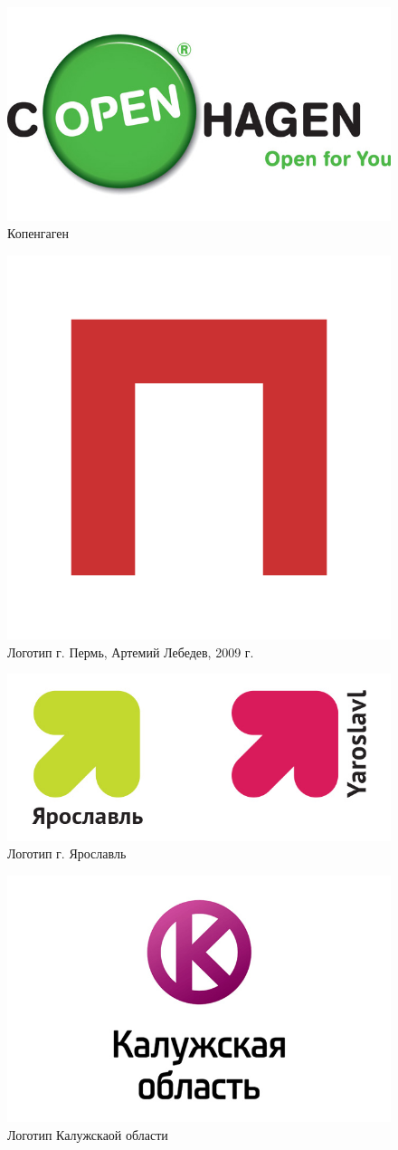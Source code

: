 \begin{figure}[ht]
  \centering
  \includegraphics[width=.5\linewidth]{images/supplement/territorial/copenhagen}
  \caption{Копенгаген}
  \label{fig:territorial:copenhagen}
\end{figure}

\begin{figure}[ht]
  \centering
  \includegraphics[width=.5\linewidth]{images/supplement/territorial/perm}
  \caption{Логотип г. Пермь, Артемий Лебедев, 2009 г.}
  \label{fig:territorial:perm}
\end{figure}

\begin{figure}[ht]
  \centering
  \includegraphics[width=.5\linewidth]{images/supplement/territorial/yaroslavl}
  \caption{Логотип г. Ярославль}
  \label{fig:territorial:yaroslavl}
\end{figure}

\begin{figure}[ht]
  \centering
  \includegraphics[width=.5\linewidth]{images/supplement/territorial/kaluga}
  \caption{Логотип Калужскаой области}
  \label{fig:territorial:kaluga}
\end{figure}

